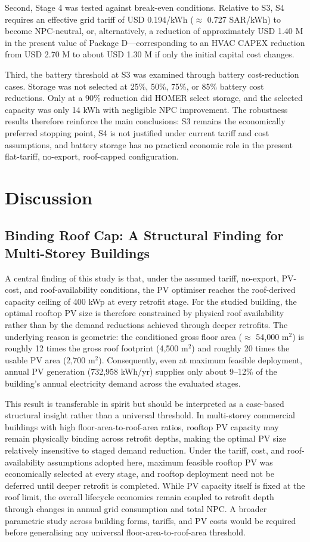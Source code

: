 \documentclass[journal,fleqn]{IEEEtran}
\begin{document}
Second, Stage 4 was tested against break-even conditions. Relative to S3, S4 requires an effective grid tariff of USD 0.194/kWh ($\approx$ 0.727 SAR/kWh) to become NPC-neutral, or, alternatively, a reduction of approximately USD 1.40 M in the present value of Package D---corresponding to an HVAC CAPEX reduction from USD 2.70 M to about USD 1.30 M if only the initial capital cost changes.


Third, the battery threshold at S3 was examined through battery cost-reduction cases. Storage was not selected at 25\%, 50\%, 75\%, or 85\% battery cost reductions. Only at a 90\% reduction did HOMER select storage, and the selected capacity was only 14 kWh with negligible NPC improvement. The robustness results therefore reinforce the main conclusions: S3 remains the economically preferred stopping point, S4 is not justified under current tariff and cost assumptions, and battery storage has no practical economic role in the present flat-tariff, no-export, roof-capped configuration.


\section{Discussion}

\subsection{Binding Roof Cap: A Structural Finding for Multi-Storey Buildings}

A central finding of this study is that, under the assumed tariff, no-export, PV-cost, and roof-availability conditions, the PV optimiser reaches the roof-derived capacity ceiling of 400 kWp at every retrofit stage. For the studied building, the optimal rooftop PV size is therefore constrained by physical roof availability rather than by the demand reductions achieved through deeper retrofits. The underlying reason is geometric: the conditioned gross floor area ($\approx$ 54,000 m$^{2}$) is roughly 12 times the gross roof footprint (4,500 m$^{2}$) and roughly 20 times the usable PV area (2,700 m$^{2}$). Consequently, even at maximum feasible deployment, annual PV generation (732,958 kWh/yr) supplies only about 9--12\% of the building's annual electricity demand across the evaluated stages.


This result is transferable in spirit but should be interpreted as a case-based structural insight rather than a universal threshold. In multi-storey commercial buildings with high floor-area-to-roof-area ratios, rooftop PV capacity may remain physically binding across retrofit depths, making the optimal PV size relatively insensitive to staged demand reduction. Under the tariff, cost, and roof-availability assumptions adopted here, maximum feasible rooftop PV was economically selected at every stage, and rooftop deployment need not be deferred until deeper retrofit is completed. While PV capacity itself is fixed at the roof limit, the overall lifecycle economics remain coupled to retrofit depth through changes in annual grid consumption and total NPC. A broader parametric study across building forms, tariffs, and PV costs would be required before generalising any universal floor-area-to-roof-area threshold.
\end{document}
